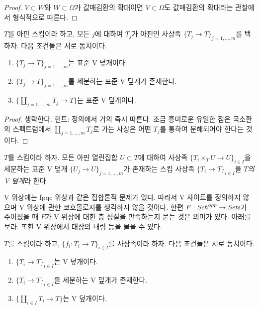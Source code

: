 \begin{proof}
$V \subset W$와 $W \subset \Omega$가 값매김환의 확대이면
$V \subset \Omega$도 값매김환의 확대라는 관찰에서 형식적으로 따른다.
\end{proof}

\begin{lemma}
\label{lemma-refine-standard-V}
$T$를 아핀 스킴이라 하고, 모든 $j$에 대하여 $T_j$가 아핀인 사상족
$\{T_j \to T\}_{j = 1, \ldots, m}$를 택하자. 다음 조건들은 서로 동치이다.
\begin{enumerate}
\item $\{T_j \to T\}_{j = 1, \ldots, m}$는 표준 V 덮개이다.
\item $\{T_j \to T\}_{j = 1, \ldots, m}$를 세분하는 표준 V 덮개가
존재한다.
\item $\{\coprod_{j = 1, \ldots, m} T_j \to T\}$는 표준 V 덮개이다.
\end{enumerate}
\end{lemma}

\begin{proof}
생략한다. 힌트: 정의에서 거의 즉시 따른다. 조금 흥미로운 유일한 점은
국소환의 스펙트럼에서 $\coprod_{j = 1, \ldots, m} T_j$로 가는 사상은
어떤 $T_j$를 통하여 분해되어야 한다는 것이다.
\end{proof}

\begin{definition}
\label{definition-V-covering}
$T$를 스킴이라 하자. 모든 아핀 열린집합 $U \subset T$에 대하여 사상족
$\{T_i \times_T U \to U\}_{i \in I}$을 세분하는 표준 V 덮개
$\{U_j \to U\}_{j = 1, \ldots, m}$가 존재하는 스킴 사상족
$\{T_i \to T\}_{i \in I}$을 {\it $T$의 V 덮개}라 한다.
\end{definition}

\noindent
V 위상에는 fpqc 위상과 같은 집합론적 문제가 있다. 따라서 V 사이트를
정의하지 않으며 V 위상에 관한 코호몰로지를 생각하지 않을 것이다. 한편
$F : \mathit{Sch}^{opp} \to \textit{Sets}$가 주어졌을 때 $F$가 V 위상에 대한
층 성질을 만족하는지 묻는 것은 의미가 있다. 아래를 보라. 또한 V 위상에서
대상의 내림 등을 물을 수 있다.

\begin{lemma}
\label{lemma-refine-by-V}
$T$를 스킴이라 하고, $\{f_i : T_i \to T\}_{i \in I}$를 사상족이라 하자.
다음 조건들은 서로 동치이다.
\begin{enumerate}
\item $\{T_i \to T\}_{i \in I}$는 V 덮개이다.
\item $\{T_i \to T\}_{i \in I}$을 세분하는 V 덮개가 존재한다.
\item $\{\coprod_{i \in I} T_i \to T\}$는 V 덮개이다.
\end{enumerate}
\end{lemma}

